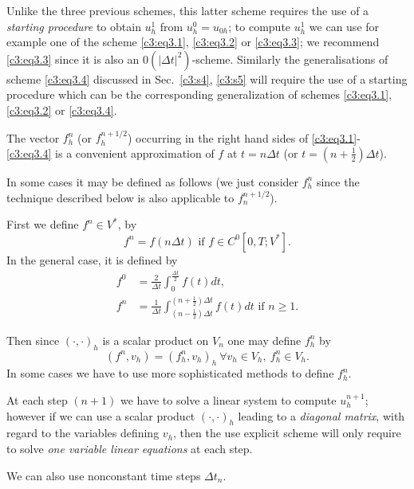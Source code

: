  Unlike the three previous schemes, this latter scheme requires the
 use of a \textit {starting procedure} to obtain $u^1_h$ from $u^0_h =
 u_{0h}$; to compute $u^1_h$ we can use for example one of the scheme
 \eqref{c3:eq3.1}, \eqref{c3:eq3.2} or \eqref{c3:eq3.3}; we recommend
 \eqref{c3:eq3.3} since it is also an $0 (|\Delta
 t|^2)$-scheme. Similarly the generalisations of scheme
 \eqref{c3:eq3.4} discussed in Sec.~\ref{c3:s4}, \ref{c3:s5} will
 require the use of a starting procedure which can be the
 corresponding generalization of schemes \eqref{c3:eq3.1},
 \eqref{c3:eq3.2} or \eqref{c3:eq3.4}. 

\begin{remark}\label{c3:rem3.1} %
The vector $f^n_h$ (or $f^{n+1/2}_h$) occurring in the right hand
sides of \eqref{c3:eq3.1}- \eqref{c3:eq3.4} is a convenient
approximation of $f$ at $t = n \Delta  t$ (or $t = (n+\frac{1}{2})
\Delta t$). 

In some cases it may be defined as follows (we just consider $f^n_h$ since the technique described below is also applicable to $f_n^{n+1/2}$).
\end{remark} 

First we define $f^n \in V^*$, by
$$
f^n = f (n \Delta  t) \text{ if } f \in C^0 [0, T; V^*].
$$
In the general case, it is defined by 
\begin{align*}
f^0  & = \frac{2}{\Delta  t} \int_0^{\frac{\Delta  t}{2}} f (t) dt,\\
f^n & = \frac{1}{\Delta  t} \int^{(n+\frac{1}{2}) \Delta  t} _{(n - \frac{1}{2}) \Delta  t} f (t) dt \text{ if } n \geq 1.
\end{align*}

Then since $(\cdot,\cdot)_h$ is a scalar product on $V_n$ one may define $f^n_h$ by
$$
(f^n, v_h) = (f^n_h, v_h)_h ~ \forall v_h \in V_h, ~ f^n_h \in V_h.
$$
In some cases we have to use more sophisticated methods to define $f_h^n$.

\begin{remark}\label{c3:rem3.2} %
At each step $(n+1)$ we have to solve a linear system to compute
$u^{n+1}_h$; however if we can use a scalar product $(\cdot ,
\cdot)_h$ leading to a {\em diagonal matrix}, with regard to the
variables defining $v_h$, then the use explicit scheme will only
require to solve {\em one variable linear equations} at each step. 
\end{remark}

\begin{remark}\label{c3:rem3.3} %
We can also use nonconstant time steps $\Delta  t_n$.
\end{remark}

